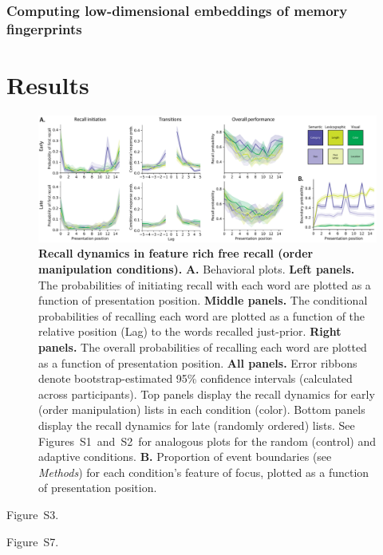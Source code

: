 \documentclass[11pt]{article}
\newcommand{\dynamicsRandom}{S1}
\newcommand{\dynamicsAdaptive}{S2}
\newcommand{\accuracyByList}{S3}
\newcommand{\recallInit}{S7}
\begin{document}
\subsubsection*{Computing low-dimensional embeddings of memory fingerprints}

\section*{Results}




\begin{figure}[tp] \centering
\includegraphics[width=\textwidth]{figures/recall_dynamics}

\caption{\textbf{Recall dynamics in feature rich free recall (order
manipulation conditions).} \textbf{A.} Behavioral plots. \textbf{Left panels.}
The probabilities of initiating recall with each word are plotted as a function
of presentation position. \textbf{Middle panels.} The conditional probabilities
of recalling each word are plotted as a function of the relative position (Lag)
to the words recalled just-prior. \textbf{Right panels.} The overall
probabilities of recalling each word are plotted as a function of presentation
position. \textbf{All panels.} Error ribbons denote bootstrap-estimated 95\%
confidence intervals (calculated across participants). Top panels display the
recall dynamics for early (order manipulation) lists in each condition (color).
Bottom panels display the recall dynamics for late (randomly ordered) lists.
See Figures~\dynamicsRandom~and~\dynamicsAdaptive~for analogous plots for the
random (control) and adaptive conditions. \textbf{B.} Proportion of event
boundaries (see \textit{Methods}) for each condition's feature of focus,
plotted as a function of presentation position.}

    \label{fig:recall-dynamics}
\end{figure}

Figure~\accuracyByList.

Figure~\recallInit.
\end{document}
